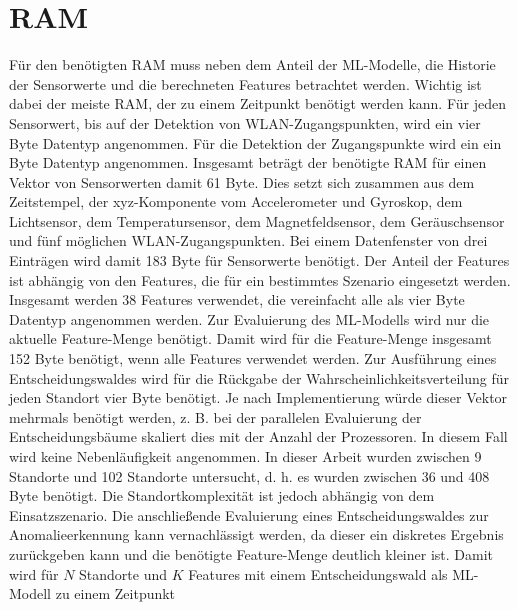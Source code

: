 \newpage
\section{RAM}
Für den benötigten RAM muss neben dem Anteil der ML-Modelle, die Historie der Sensorwerte und die berechneten Features betrachtet werden.
Wichtig ist dabei der meiste RAM, der zu einem Zeitpunkt benötigt werden kann.
\newline
\newline
Für jeden Sensorwert, bis auf der Detektion von WLAN-Zugangspunkten, wird ein vier Byte Datentyp angenommen.
Für die Detektion der Zugangspunkte wird ein ein Byte Datentyp angenommen.
Insgesamt beträgt der benötigte RAM für einen Vektor von Sensorwerten damit 61 Byte.
\newline
\newline
Dies setzt sich zusammen aus dem Zeitstempel, der xyz-Komponente vom Accelerometer und Gyroskop, dem Lichtsensor,
dem Temperatursensor, dem Magnetfeldsensor, dem Geräuschsensor und fünf möglichen WLAN-Zugangspunkten.
Bei einem Datenfenster von drei Einträgen wird damit 183 Byte für Sensorwerte benötigt.
\newline
\newline
Der Anteil der Features ist abhängig von den Features, die für ein bestimmtes Szenario eingesetzt werden.
Insgesamt werden 38 Features verwendet, die vereinfacht alle als vier Byte Datentyp angenommen werden.
Zur Evaluierung des ML-Modells wird nur die aktuelle Feature-Menge benötigt.
Damit wird für die Feature-Menge insgesamt 152 Byte benötigt, wenn alle Features verwendet werden.
\newline
\newline
Zur Ausführung eines Entscheidungswaldes wird für die Rückgabe der Wahrscheinlichkeitsverteilung für jeden Standort vier Byte benötigt.
Je nach Implementierung würde dieser Vektor mehrmals benötigt werden, z. B. bei der parallelen Evaluierung der Entscheidungsbäume skaliert dies mit der Anzahl der Prozessoren.
In diesem Fall wird keine Nebenläufigkeit angenommen.
In dieser Arbeit wurden zwischen 9 Standorte und 102 Standorte untersucht, d. h. es wurden zwischen 36 und 408 Byte benötigt.
Die Standortkomplexität ist jedoch abhängig von dem Einsatzszenario.
Die anschließende Evaluierung eines Entscheidungswaldes zur Anomalieerkennung kann vernachlässigt werden,
da dieser ein diskretes Ergebnis zurückgeben kann und die benötigte Feature-Menge deutlich kleiner ist.
Damit wird für $N$ Standorte und $K$ Features mit einem Entscheidungswald als ML-Modell zu einem Zeitpunkt
